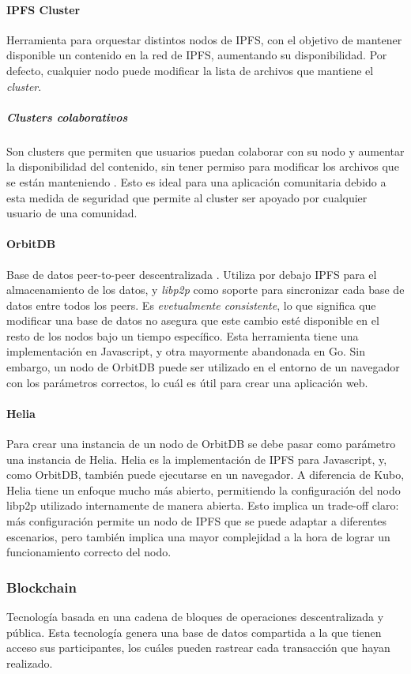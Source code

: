 \paragraph{IPFS Cluster} Herramienta para orquestar distintos nodos de IPFS, con el objetivo de mantener disponible un contenido en la red de IPFS, aumentando su disponibilidad. Por defecto, cualquier nodo puede modificar la lista de archivos que mantiene el \textit{cluster}.
\subparagraph{Clusters colaborativos} Son clusters que permiten que usuarios puedan colaborar con su nodo y aumentar la disponibilidad del contenido, sin tener permiso para modificar los archivos que se están manteniendo \cite{collaborative-clusters}. Esto es ideal para una aplicación comunitaria debido a esta medida de seguridad que permite al cluster ser apoyado por cualquier usuario de una comunidad.

\paragraph{OrbitDB} Base de datos peer-to-peer descentralizada \cite{orbitdb}. Utiliza por debajo IPFS para el almacenamiento de los datos, y \textit{libp2p} como soporte para sincronizar cada base de datos entre todos los peers. Es \textit{evetualmente consistente}, lo que significa que modificar una base de datos no asegura que este cambio esté disponible en el resto de los nodos bajo un tiempo específico. Esta herramienta tiene una implementación en Javascript, y otra mayormente abandonada en Go. Sin embargo, un nodo de OrbitDB puede ser utilizado en el entorno de un navegador con los parámetros correctos, lo cuál es útil para crear una aplicación web.

\paragraph{Helia} Para crear una instancia de un nodo de OrbitDB se debe pasar como parámetro una instancia de Helia. Helia \cite{helia} es la implementación de IPFS para Javascript, y, como OrbitDB, también puede ejecutarse en un navegador. A diferencia de Kubo, Helia tiene un enfoque mucho más abierto, permitiendo la configuración del nodo libp2p utilizado internamente de manera abierta. Esto implica un trade-off claro: más configuración permite un nodo de IPFS que se puede adaptar a diferentes escenarios, pero también implica una mayor complejidad a la hora de lograr un funcionamiento correcto del nodo.

\subsubsection{Blockchain}
Tecnología basada en una cadena de bloques de operaciones descentralizada y pública.  Esta tecnología genera una base de datos compartida a la que tienen acceso sus participantes, los cuáles pueden rastrear cada transacción que hayan realizado.\parencite{blockchain}


